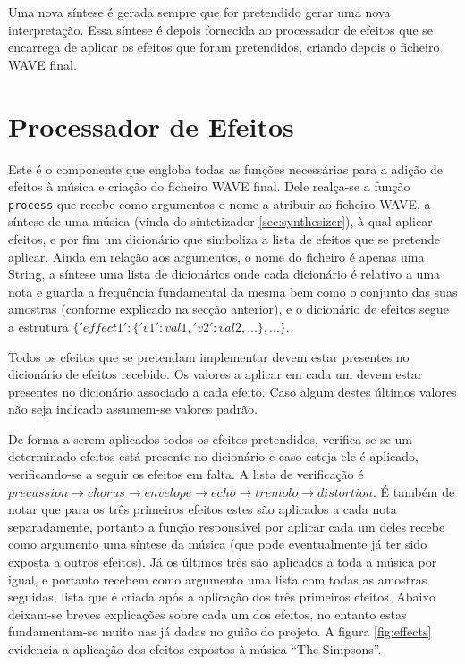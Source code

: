\documentclass[a4paper,11pt,openright,oneside]{report}
\begin{document}
Uma nova síntese é gerada sempre que for pretendido gerar uma nova interpretação. Essa síntese é depois fornecida ao processador de efeitos que se encarrega de aplicar os efeitos que foram pretendidos, criando depois o ficheiro WAVE final.

\section{Processador de Efeitos}
\label{sec:effects}

Este é o componente que engloba todas as funções necessárias para a adição de efeitos à música e criação do ficheiro WAVE final. Dele realça-se a função \verb|process| que recebe como argumentos o nome a atribuir ao ficheiro WAVE, a síntese de uma música (vinda do sintetizador \ref{sec:synthesizer}), à qual aplicar efeitos, e por fim um dicionário que simboliza a lista de efeitos que se pretende aplicar. Ainda em relação aos argumentos, o nome do ficheiro é apenas uma String, a síntese uma lista de dicionários onde cada dicionário é relativo a uma nota e guarda a frequência fundamental da mesma bem como o conjunto das suas amostras (conforme explicado na secção anterior), e o dicionário de efeitos segue a estrutura $\{'effect1': \{'v1': val1, 'v2': val2, ...\}, ...\}$.

Todos os efeitos que se pretendam implementar devem estar presentes no dicionário de efeitos recebido. Os valores a aplicar em cada um devem estar presentes no dicionário associado a cada efeito. Caso algum destes últimos valores não seja indicado assumem-se valores padrão.

De forma a serem aplicados todos os efeitos pretendidos, verifica-se se um determinado efeitos está presente no dicionário e caso esteja ele é aplicado, verificando-se a seguir os efeitos em falta. A lista de verificação é $precussion \rightarrow chorus \rightarrow envelope \rightarrow echo \rightarrow tremolo \rightarrow distortion$. É também de notar que para os três primeiros efeitos estes são aplicados a cada nota separadamente, portanto a função responsável por aplicar cada um deles recebe como argumento uma síntese da música (que pode eventualmente já ter sido exposta a outros efeitos). Já os últimos três são aplicados a toda a música por igual, e portanto recebem como argumento uma lista com todas as amostras seguidas, lista que é criada após a aplicação dos três primeiros efeitos. Abaixo deixam-se breves explicações sobre cada um dos efeitos, no entanto estas fundamentam-se muito nas já dadas no guião do projeto. A figura \ref{fig:effects} evidencia a aplicação dos efeitos expostos à música ``The Simpsons''.
\end{document}
